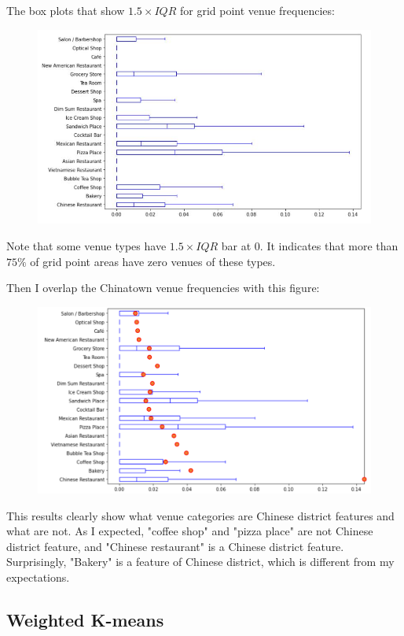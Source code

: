 \documentclass{article}
\begin{document}
The box plots that show $1.5 \times IQR$ for grid point venue frequencies:
\begin{figure}[h!]
\includegraphics[width=1.0\textwidth]{cn2.jpg}
\centering
\end{figure}
Note that some venue types have $1.5 \times IQR$ bar at 0. It indicates that more than $75\%$ of grid point areas have zero venues of these types.

Then I overlap the Chinatown venue frequencies with this figure:
\begin{figure}[h!]
\includegraphics[width=1.0\textwidth]{cn3.pdf}
\centering
\end{figure}
This results clearly show what venue categories are Chinese district features and what are not.
As I expected, "coffee shop" and "pizza place" are not Chinese district feature, and "Chinese restaurant" is a Chinese district feature.
Surprisingly, "Bakery" is a feature of Chinese district, which is different from my expectations.

\newpage

\subsection{Weighted K-means}
\end{document}
